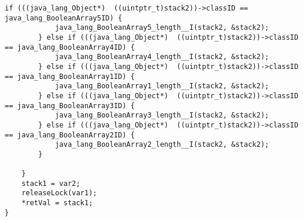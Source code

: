 \begin{lstlisting}[firstnumber=472]
		if (((java_lang_Object*)  ((uintptr_t)stack2))->classID == java_lang_BooleanArray5ID) {
			java_lang_BooleanArray5_length__I(stack2, &stack2);
		} else if (((java_lang_Object*)  ((uintptr_t)stack2))->classID == java_lang_BooleanArray4ID) {
			java_lang_BooleanArray4_length__I(stack2, &stack2);
		} else if (((java_lang_Object*)  ((uintptr_t)stack2))->classID == java_lang_BooleanArray1ID) {
			java_lang_BooleanArray1_length__I(stack2, &stack2);
		} else if (((java_lang_Object*)  ((uintptr_t)stack2))->classID == java_lang_BooleanArray3ID) {
			java_lang_BooleanArray3_length__I(stack2, &stack2);
		} else if (((java_lang_Object*)  ((uintptr_t)stack2))->classID == java_lang_BooleanArray2ID) {
			java_lang_BooleanArray2_length__I(stack2, &stack2);
		}

	}
	stack1 = var2;
	releaseLock(var1);
	*retVal = stack1;
}
\end{lstlisting}


